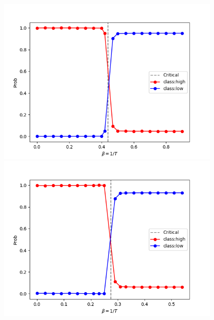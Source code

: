 \documentclass[a4paper,11pt]{jsreport}
\begin{document}
\begin{figure}[H]
  \begin{minipage}[b]{0.45\linewidth}
    \begin{center}
      \includegraphics[keepaspectratio, scale=0.4]{image/分類機_正方イジング_CNN.png}
    \end{center}  
  \end{minipage}
  \begin{minipage}[b]{0.45\linewidth}
    \begin{center}
      \includegraphics[keepaspectratio, scale=0.4]{image/分類機_三角イジング_CNN.png}
    \end{center}
  \end{minipage}
\end{figure}
\end{document}
